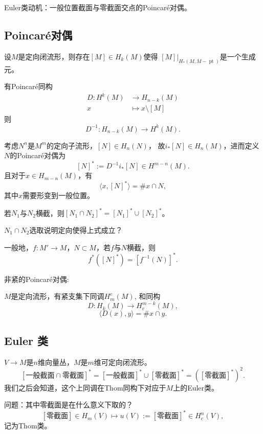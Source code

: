     \qquad Euler类动机：一般位置截面与零截面交点的Poincaré对偶。

    \subsection{Poincaré对偶}
        \qquad 设$M$是定向闭流形，则存在$[M]\in H_k(M)$使得
        $[M]|_{H_*(M, M-\operatorname{pt})}$是一个生成元。
        
        \qquad 有Poincaré同构
            \begin{align*}
            D: H^k(M) &\rightarrow H_{n-k}(M)\\
                x &\mapsto x\setminus [M]
            \end{align*}
    则
        $$D^{-1}: H_{n-k}(M) \rightarrow H^k(M).$$

        \qquad 考虑$N^n$是$M^m$的定向子流形，$[N] \in H_n(N)$，
        故$i_* [N]\in H_n(M)$，进而定义$N$的Poincaré对偶为
            $$[N]^* := D^{-1} i_*[N] \in H^{m-n}(M).$$
且对于$x\in H_{m-n}(M)$，有
            $$\langle x, [N]^* \rangle = \# x \cap N,$$
其中$x$需要形变到一般位置。

        \qquad 若$N_1$与$N_2$横截，则$[N_1 \cap N_2]^* =[N_1]^* \cup [N_2]^*$。

    \begin{exercise}
        $N_1 \cap N_2$选取说明定向使得上式成立？
    \end{exercise}

        \qquad 一般地，$f: M' \rightarrow M$，$N\subset M$，若$f$与$N$横截，则
            $$f^*([N]^*) =[f^{-1}(N)]^*.$$

    非紧的Poincaré对偶:

        \qquad $M$是定向流形，有紧支集下同调$H^c_m(M)$, 和同构
            $$D: H_k(M) \rightarrow H^{m-k}_c(M),$$
            $$\langle D(x), y\rangle = \# x\cap y.$$
    
\subsection{Euler 类}
    \qquad $V \rightarrow M$是$n$维向量丛，$M$是$m$维可定向闭流形。
    $$[\text{一般截面}\cap \text{零截面}]^* = [\text{一般截面}]^* \cup [\text{零截面}]^* = ([\text{零截面}]^*)^2.$$
我们之后会知道，这个上同调在Thom同构下对应于$M$上的Euler类。

    \qquad 问题：其中零截面是在什么意义下取的？
    $$[\text{零截面}] \in H_m(V) \mapsto u(V):=[\text{零截面}]^* \in H^n_c(V),$$
记为Thom类。

